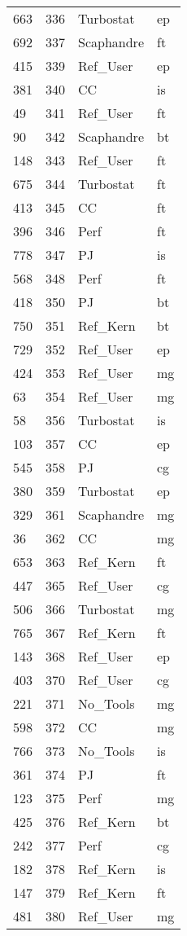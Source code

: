 \begin{tabular}{lrll}
663 & 336 & Turbostat & ep \\
692 & 337 & Scaphandre & ft \\
415 & 339 & Ref_User & ep \\
381 & 340 & CC & is \\
49 & 341 & Ref_User & ft \\
90 & 342 & Scaphandre & bt \\
148 & 343 & Ref_User & ft \\
675 & 344 & Turbostat & ft \\
413 & 345 & CC & ft \\
396 & 346 & Perf & ft \\
778 & 347 & PJ & is \\
568 & 348 & Perf & ft \\
418 & 350 & PJ & bt \\
750 & 351 & Ref_Kern & bt \\
729 & 352 & Ref_User & ep \\
424 & 353 & Ref_User & mg \\
63 & 354 & Ref_User & mg \\
58 & 356 & Turbostat & is \\
103 & 357 & CC & ep \\
545 & 358 & PJ & cg \\
380 & 359 & Turbostat & ep \\
329 & 361 & Scaphandre & mg \\
36 & 362 & CC & mg \\
653 & 363 & Ref_Kern & ft \\
447 & 365 & Ref_User & cg \\
506 & 366 & Turbostat & mg \\
765 & 367 & Ref_Kern & ft \\
143 & 368 & Ref_User & ep \\
403 & 370 & Ref_User & cg \\
221 & 371 & No_Tools & mg \\
598 & 372 & CC & mg \\
766 & 373 & No_Tools & is \\
361 & 374 & PJ & ft \\
123 & 375 & Perf & mg \\
425 & 376 & Ref_Kern & bt \\
242 & 377 & Perf & cg \\
182 & 378 & Ref_Kern & is \\
147 & 379 & Ref_Kern & ft \\
481 & 380 & Ref_User & mg \\

\end{tabular}
